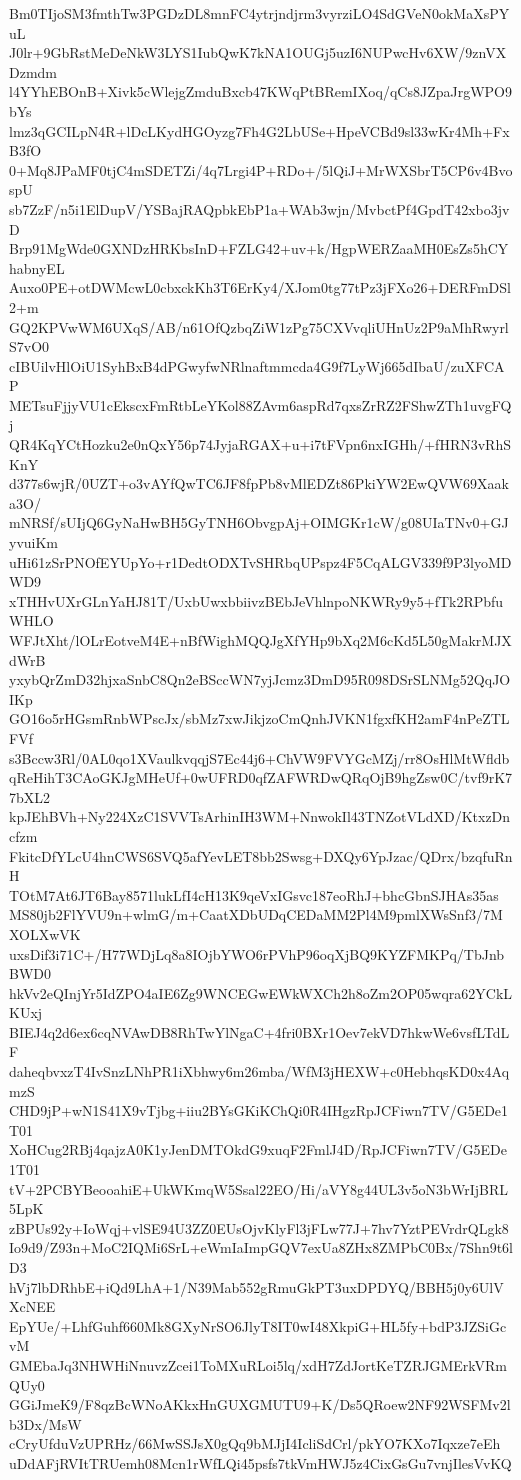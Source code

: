 Bm0TIjoSM3fmthTw3PGDzDL8mnFC4ytrjndjrm3vyrziLO4SdGVeN0okMaXsPYuL
J0lr+9GbRstMeDeNkW3LYS1IubQwK7kNA1OUGj5uzI6NUPwcHv6XW/9znVXDzmdm
l4YYhEBOnB+Xivk5cWlejgZmduBxcb47KWqPtBRemIXoq/qCs8JZpaJrgWPO9bYs
lmz3qGCILpN4R+lDcLKydHGOyzg7Fh4G2LbUSe+HpeVCBd9sl33wKr4Mh+FxB3fO
0+Mq8JPaMF0tjC4mSDETZi/4q7Lrgi4P+RDo+/5lQiJ+MrWXSbrT5CP6v4BvospU
sb7ZzF/n5i1ElDupV/YSBajRAQpbkEbP1a+WAb3wjn/MvbctPf4GpdT42xbo3jvD
Brp91MgWde0GXNDzHRKbsInD+FZLG42+uv+k/HgpWERZaaMH0EsZs5hCYhabnyEL
Auxo0PE+otDWMcwL0cbxckKh3T6ErKy4/XJom0tg77tPz3jFXo26+DERFmDSl2+m
GQ2KPVwWM6UXqS/AB/n61OfQzbqZiW1zPg75CXVvqliUHnUz2P9aMhRwyrlS7vO0
cIBUilvHlOiU1SyhBxB4dPGwyfwNRlnaftmmcda4G9f7LyWj665dIbaU/zuXFCAP
METsuFjjyVU1cEkscxFmRtbLeYKol88ZAvm6aspRd7qxsZrRZ2FShwZTh1uvgFQj
QR4KqYCtHozku2e0nQxY56p74JyjaRGAX+u+i7tFVpn6nxIGHh/+fHRN3vRhSKnY
d377s6wjR/0UZT+o3vAYfQwTC6JF8fpPb8vMlEDZt86PkiYW2EwQVW69Xaaka3O/
mNRSf/sUIjQ6GyNaHwBH5GyTNH6ObvgpAj+OIMGKr1cW/g08UIaTNv0+GJyvuiKm
uHi61zSrPNOfEYUpYo+r1DedtODXTvSHRbqUPspz4F5CqALGV339f9P3lyoMDWD9
xTHHvUXrGLnYaHJ81T/UxbUwxbbiivzBEbJeVhlnpoNKWRy9y5+fTk2RPbfuWHLO
WFJtXht/lOLrEotveM4E+nBfWighMQQJgXfYHp9bXq2M6cKd5L50gMakrMJXdWrB
yxybQrZmD32hjxaSnbC8Qn2eBSccWN7yjJcmz3DmD95R098DSrSLNMg52QqJOIKp
GO16o5rHGsmRnbWPscJx/sbMz7xwJikjzoCmQnhJVKN1fgxfKH2amF4nPeZTLFVf
s3Bccw3Rl/0AL0qo1XVaulkvqqjS7Ec44j6+ChVW9FVYGcMZj/rr8OsHlMtWfldb
qReHihT3CAoGKJgMHeUf+0wUFRD0qfZAFWRDwQRqOjB9hgZsw0C/tvf9rK77bXL2
kpJEhBVh+Ny224XzC1SVVTsArhinIH3WM+NnwokIl43TNZotVLdXD/KtxzDncfzm
FkitcDfYLcU4hnCWS6SVQ5afYevLET8bb2Swsg+DXQy6YpJzac/QDrx/bzqfuRnH
TOtM7At6JT6Bay8571lukLfI4cH13K9qeVxIGsvc187eoRhJ+bhcGbnSJHAs35as
MS80jb2FlYVU9n+wlmG/m+CaatXDbUDqCEDaMM2Pl4M9pmlXWsSnf3/7MXOLXwVK
uxsDif3i71C+/H77WDjLq8a8IOjbYWO6rPVhP96oqXjBQ9KYZFMKPq/TbJnbBWD0
hkVv2eQInjYr5IdZPO4aIE6Zg9WNCEGwEWkWXCh2h8oZm2OP05wqra62YCkLKUxj
BIEJ4q2d6ex6cqNVAwDB8RhTwYlNgaC+4fri0BXr1Oev7ekVD7hkwWe6vsfLTdLF
daheqbvxzT4IvSnzLNhPR1iXbhwy6m26mba/WfM3jHEXW+c0HebhqsKD0x4AqmzS
CHD9jP+wN1S41X9vTjbg+iiu2BYsGKiKChQi0R4IHgzRpJCFiwn7TV/G5EDe1T01
XoHCug2RBj4qajzA0K1yJenDMTOkdG9xuqF2FmlJ4D/RpJCFiwn7TV/G5EDe1T01
tV+2PCBYBeooahiE+UkWKmqW5Ssal22EO/Hi/aVY8g44UL3v5oN3bWrIjBRL5LpK
zBPUs92y+IoWqj+vlSE94U3ZZ0EUsOjvKlyFl3jFLw77J+7hv7YztPEVrdrQLgk8
Io9d9/Z93n+MoC2IQMi6SrL+eWmIaImpGQV7exUa8ZHx8ZMPbC0Bx/7Shn9t6lD3
hVj7lbDRhbE+iQd9LhA+1/N39Mab552gRmuGkPT3uxDPDYQ/BBH5j0y6UlVXcNEE
EpYUe/+LhfGuhf660Mk8GXyNrSO6JlyT8IT0wI48XkpiG+HL5fy+bdP3JZSiGcvM
GMEbaJq3NHWHiNnuvzZcei1ToMXuRLoi5lq/xdH7ZdJortKeTZRJGMErkVRmQUy0
GGiJmeK9/F8qzBcWNoAKkxHnGUXGMUTU9+K/Ds5QRoew2NF92WSFMv2lb3Dx/MsW
cCryUfduVzUPRHz/66MwSSJsX0gQq9bMJjI4IcliSdCrl/pkYO7KXo7Iqxze7eEh
uDdAFjRVItTRUemh08Mcn1rWfLQi45psfs7tkVmHWJ5z4CixGsGu7vnjIlesVvKQ
